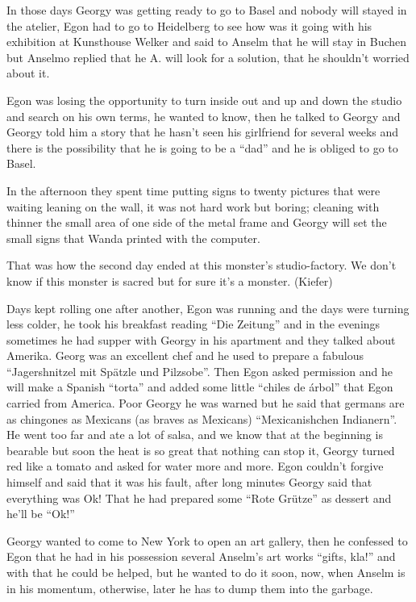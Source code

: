 \documentclass[smalldemyvopaper,11pt,twoside,onecolumn,openright,extrafontsizes]{memoir}
\begin{document}
In those days Georgy was getting ready to go to Basel and nobody will stayed in the atelier, Egon had to go to Heidelberg to see how was it going with his exhibition at Kunsthouse Welker and said to Anselm that he will stay in Buchen but Anselmo replied that he A. will look for a solution, that he shouldn’t worried about it.

Egon was losing the opportunity to turn inside out and up and down the studio and search on his own terms, he wanted to know, then he talked to Georgy and Georgy told him a story that he hasn’t seen his girlfriend for several weeks and there is the possibility that he is going to be a “dad” and he is obliged to go to Basel.

In the afternoon they spent time putting signs to twenty pictures that were waiting leaning on the wall, it was not hard work but boring; cleaning with thinner the small area of one side of the metal frame and Georgy will set the small signs that Wanda printed with the computer.

\ornamentbreak

That was how the second day ended at this monster’s studio-factory. We don’t know if this monster is sacred but for sure it’s a monster. (Kiefer)

Days kept rolling one after another, Egon was running and the days were turning less colder, he took his breakfast reading “Die Zeitung” and in the evenings sometimes he had supper with Georgy in his apartment and they talked about Amerika. Georg was an excellent chef and he used to prepare a fabulous “Jagershnitzel mit Spätzle und Pilzsobe”. Then Egon asked permission and he will make a Spanish “torta” and added some little “chiles de árbol” that Egon carried from America. Poor Georgy he was warned but he said that germans are as chingones as Mexicans (as braves as Mexicans) “Mexicanishchen Indianern”. He went too far and ate a lot of salsa, and we know that at the beginning is bearable but soon the heat is so great that nothing can stop it, Georgy turned red like a tomato and asked for water more and more. Egon couldn’t forgive himself and said that it was his fault, after long minutes Georgy said that everything was Ok! That he had prepared some “Rote Grütze” as dessert and he’ll be “Ok!”

Georgy wanted to come to New York to open an art gallery, then he confessed to Egon that he had in his possession several Anselm’s art works “gifts, kla!” and with that he could be helped, but he wanted to do it soon, now, when Anselm is in his momentum, otherwise, later he has to dump them into the garbage. 
\end{document}
